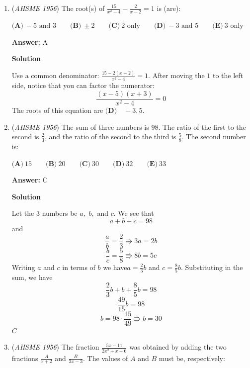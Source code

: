 \begin{enumerate}
 Let $AR = r$ and $PE = a$. We now have a system of equations.

 
 \[(10\sqrt{3})^2+r^2=PR^2\]
 \[(\sqrt{r^2-10^2})^2+PE^2=r^2-10^2+PE^2=PR^2\]

 Set them equal to each other and solve.

 
 \[(10\sqrt{3})^2+r^2=r^2-10^2+PE^2\]
 \[(10\sqrt{3})^2=-10^2+PE^2\]
 \[400=PE^2\]
 \[20=PE\]

 We know $BE = 10$, so $PE = 20 - 10 = 10$, which is $\boxed{B}$.

 


	\item (\textit{AHSME 1956}) The root(s) of $\frac {15}{x^2 - 4} - \frac {2}{x - 2} = 1$ is (are): 


 $\textbf{(A)}\ -5\text{ and }3\qquad \textbf{(B)}\ \pm 2\qquad \textbf{(C)}\ 2\text{ only}\qquad \textbf{(D)}\ -3\text{ and }5\qquad \textbf{(E)}\ 3\text{ only}$

 \textbf{Answer: }A



\textbf{Solution}

Use a common denominator: $\frac{15 - 2(x+2)}{x^2-4} = 1$. After moving the $1$ to the left side, notice that you can factor the numerator:
 \[\frac{(x-5)(x+3)}{x^2-4} = 0\]The roots of this equation are $\boxed{\textbf{(D)} \quad -3, 5}.$



	\item (\textit{AHSME 1956}) The sum of three numbers is $98$. The ratio of the first to the second is $\frac {2}{3}$, 
and the ratio of the second to the third is $\frac {5}{8}$. The second number is: 


 $\textbf{(A)}\ 15 \qquad\textbf{(B)}\ 20 \qquad\textbf{(C)}\ 30 \qquad\textbf{(D)}\ 32 \qquad\textbf{(E)}\ 33$

 \textbf{Answer: }C



\textbf{Solution}

Let the $3$ numbers be $a,$ $b,$ and $c$. We see that 
 \[a+b+c = 98\]and 
 \[\frac{a}{b} = \frac{2}{3} \Rrightarrow 3a = 2b\]
 \[\frac{b}{c} = \frac{5}{8} \Rrightarrow 8b = 5c\]Writing $a$ and $c$ in terms of $b$ we have$a = \frac{2}{3} b$ and $c = \frac{8}{5} b$. Substituting in the sum, we have
 \[\frac{2}{3} b + b + \frac{8}{5} b = 98\]
 \[\frac{49}{15} b = 98\]
 \[b = 98 \cdot \frac{15}{49} \Rrightarrow b = 30\]$\boxed{C}$



	\item (\textit{AHSME 1956}) The fraction $\frac {5x - 11}{2x^2 + x - 6}$ was obtained by adding the two fractions $\frac {A}{x + 2}$ and 
$\frac {B}{2x - 3}$. The values of $A$ and $B$ must be, respectively: 



\end{enumerate}

